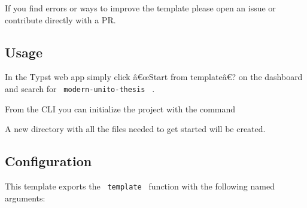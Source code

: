 If you find errors or ways to improve the template please open an issue
or contribute directly with a PR.

\subsection{Usage}\label{usage}

In the Typst web app simply click â€œStart from templateâ€? on the
dashboard and search for \texttt{\ modern-unito-thesis\ } .

From the CLI you can initialize the project with the command

\begin{Shaded}
\begin{Highlighting}[]
\end{Highlighting}
\end{Shaded}

A new directory with all the files needed to get started will be
created.

\subsection{Configuration}\label{configuration}

This template exports the \texttt{\ template\ } function with the
following named arguments:

